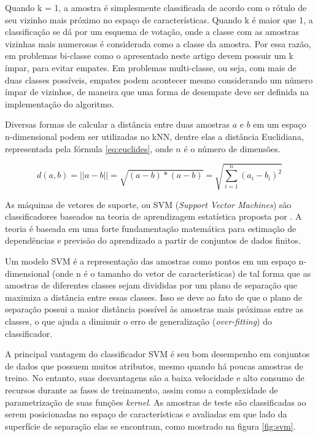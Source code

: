 Quando k = 1, a amostra é simplesmente classificada de acordo com o rótulo de seu vizinho mais próximo no espaço de características. Quando k é maior que 1, a classificação se dá por um esquema de votação, onde a classe com as amostras vizinhas mais numerosas é considerada como a classe da amostra. Por essa razão, em problemas bi-classe como o apresentado neste artigo devem possuir um k ímpar, para evitar empates. Em problemas multi-classe, ou seja, com mais de duas classes possíveis, empates podem acontecer mesmo considerando um número ímpar de vizinhos, de maneira que uma forma de desempate deve ser definida na implementação do algoritmo.

Diversas formas de calcular a distância entre duas amostras $a$ e $b$ em um espaço n-dimensional podem ser utilizadas no kNN, dentre elas a distância Euclidiana, representada pela fórmula \ref{eq:euclides}, onde $n$ é o número de dimensões.

\begin{equation}
	\displaystyle d(a,b) = ||a - b|| = \sqrt{(a - b)*(a -b)} =
	\displaystyle \sqrt{\sum_{i=1}^{n}(a_i - b_i)^2}
\label{eq:euclides}
\end{equation}

As máquinas de vetores de suporte, ou SVM (\textit{Support Vector Machines}) são classificadores baseados na teoria de aprendizagem estatística proposta por \cite{vapnik:1995}. A teoria é baseada em uma forte fundamentação matemática para estimação de dependências e previsão do aprendizado a partir de conjuntos de dados finitos. 

Um modelo SVM é a representação das amostras como pontos em um espaço n-dimensional (onde n é o tamanho do vetor de características) de tal forma que as amostras de diferentes classes sejam divididas por um plano de separação que maximiza a distância entre essas classes. Isso se deve ao fato de que o plano de separação possui a maior distância possível às amostras mais próximas entre as classes, o que ajuda a diminuir o erro de generalização (\textit{over-fitting}) do classificador.

A principal vantagem do classificador SVM é seu bom desempenho em conjuntos de dados que possuem muitos atributos, mesmo quando há poucas amostras de treino. No entanto, suas desvantagens são a baixa velocidade e alto consumo de recursos durante as fases de treinamento, assim como a complexidade de parametrização de suas funções \textit{kernel}. As amostras de teste são classificadas ao serem posicionadas no espaço de características e avaliadas em que lado da superfície de separação elas se encontram, como mostrado na figura \ref{fig:svm}.

